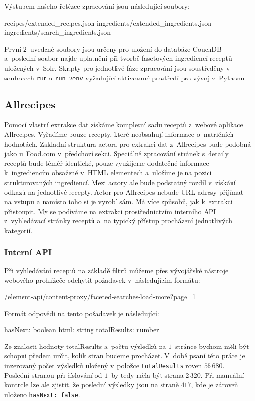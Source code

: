 Výstupem našeho řetězce zpracování jsou následující soubory:
\begin{code}
recipes/extended_recipes.json
ingredients/extended_ingredients.json
ingredients/search_ingredients.json
\end{code}
První $2$~uvedené soubory jsou určeny pro uložení do databáze CouchDB a~poslední soubor najde uplatnění při tvorbě fasetových ingrediencí receptů uložených v~Solr. Skripty pro jednotlivé fáze zpracování jsou soustředěny v souborech \texttt{run} a \texttt{run-venv} vyžadující aktivované prostředí pro vývoj v~Pythonu.

\subsection{Allrecipes}

Pomocí vlastní extrakce dat získáme kompletní sadu receptů z~webové aplikace Allrecipes. Vyřadíme pouze recepty, které neobsahují informace o~nutričních hodnotách. Základní struktura actora pro extrakci dat z~Allrecipes bude podobná jako u~Food.com v~předchozí sekci. Speciálně zpracování stránek s~detaily receptů bude téměř identické, pouze využijeme dodatečné informace k~ingrediencím obsažené v~HTML elementech a~uložíme je na pozici strukturovaných ingrediencí. Mezi actory ale bude podstatný rozdíl v~získání odkazů na jednotlivé recepty. Actor pro Allrecipes nebude URL adresy přijímat na vstupu a namísto toho si je vyrobí sám. Má více způsobů, jak k~extrakci přistoupit. My se podíváme na extrakci prostřednictvím interního API z~vyhledávací stránky receptů a~na typický přístup procházení jednotlivých kategorií.

\subsubsection{Interní API}

Při vyhledávání receptů na základě filtrů můžeme přes vývojářské nástroje webového prohlížeče odchytit požadavek v~následujícím formátu:

\begin{code}
/element-api/content-proxy/faceted-searches-load-more?page=1
\end{code}
Formát odpovědi na tento požadavek je následující:
\begin{code}
{
    hasNext: boolean
    html: string
    totalResults: number
}
\end{code}

Ze znalosti hodnoty {totalResults} a~počtu výsledků na $1$~stránce bychom měli být schopni předem určit, kolik stran budeme procházet. V~době psaní této práce je inzerovaný počet výsledků uložený v~položce \texttt{totalResults} roven $55\,680$. Poslední stranou při číslování od $1$~by tedy měla být strana $2\,320$. Při manuální kontrole lze ale zjistit, že poslední výsledky jsou na straně $417$, kde je zároveň uloženo \texttt{hasNext:\,false}.

